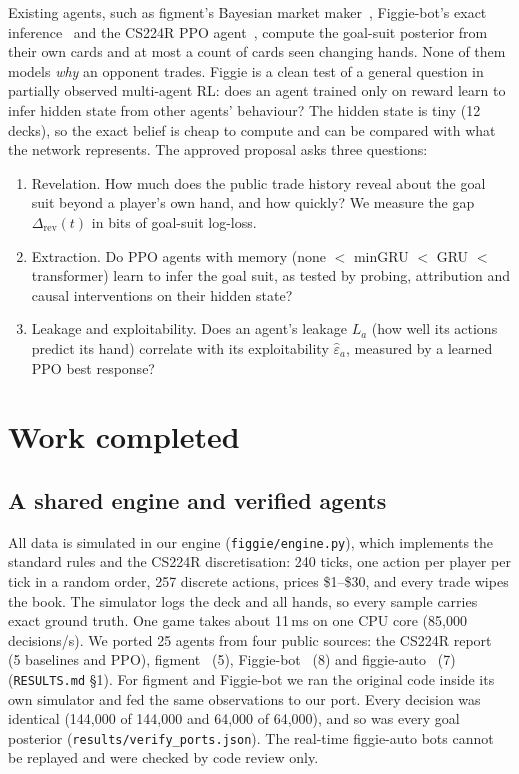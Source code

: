 \documentclass{article}
\newcommand{\file}[1]{{\small\texttt{#1}}}
\begin{document}
Existing agents, such as figment's Bayesian market maker~\cite{figment}, Figgie-bot's exact inference~\cite{figgiebot} and the CS224R PPO agent~\cite{cs224r}, compute the goal-suit posterior from their own cards and at most a count of cards seen changing hands. None of them models \emph{why} an opponent trades.
Figgie is a clean test of a general question in partially observed multi-agent RL: does an agent trained only on reward learn to infer hidden state from other agents' behaviour?
The hidden state is tiny (12 decks), so the exact belief is cheap to compute and can be compared with what the network represents.
The approved proposal asks three questions:
\begin{enumerate}[label=Q\arabic*.]
  \item Revelation. How much does the public trade history reveal about the goal suit beyond a player's own hand, and how quickly? We measure the gap $\Delta_{\text{rev}}(t)$ in bits of goal-suit log-loss.
  \item Extraction. Do PPO agents with memory (none $<$ minGRU $<$ GRU $<$ transformer) learn to infer the goal suit, as tested by probing, attribution and causal interventions on their hidden state?
  \item Leakage and exploitability. Does an agent's leakage $L_a$ (how well its actions predict its hand) correlate with its exploitability $\hat\varepsilon_a$, measured by a learned PPO best response?
\end{enumerate}

\section{Work completed}

\subsection{A shared engine and verified agents}
All data is simulated in our engine (\file{figgie/engine.py}), which implements the standard rules and the CS224R discretisation: 240 ticks, one action per player per tick in a random order, 257 discrete actions, prices \$1--\$30, and every trade wipes the book.
The simulator logs the deck and all hands, so every sample carries exact ground truth.
One game takes about 11\,ms on one CPU core (85{,}000 decisions/s).
We ported 25 agents from four public sources: the CS224R report~\cite{cs224r} (5 baselines and PPO), figment~\cite{figment} (5), Figgie-bot~\cite{figgiebot} (8) and figgie-auto~\cite{figgieauto} (7) (\file{RESULTS.md} \S1).
For figment and Figgie-bot we ran the original code inside its own simulator and fed the same observations to our port. Every decision was identical (144{,}000 of 144{,}000 and 64{,}000 of 64{,}000), and so was every goal posterior (\file{results/verify\_ports.json}).
The real-time figgie-auto bots cannot be replayed and were checked by code review only.
\end{document}

